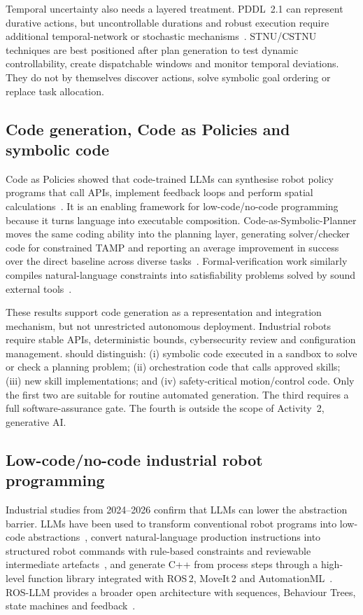 \documentclass{plan4ari_report}
\begin{document}
Temporal uncertainty also needs a layered treatment. PDDL~2.1 can represent durative actions, but uncontrollable durations and robust execution require additional temporal-network or stochastic mechanisms~\cite{fox2003pddl21,cimatti2018strong}. STNU/CSTNU techniques are best positioned after plan generation to test dynamic controllability, create dispatchable windows and monitor temporal deviations. They do not by themselves discover actions, solve symbolic goal ordering or replace task allocation.

\subsection{Code generation, Code as Policies and symbolic code}
Code as Policies showed that code-trained LLMs can synthesise robot policy programs that call APIs, implement feedback loops and perform spatial calculations~\cite{liang2023cap}. It is an enabling framework for low-code/no-code programming because it turns language into executable composition. Code-as-Symbolic-Planner moves the same coding ability into the planning layer, generating solver/checker code for constrained TAMP and reporting an average improvement in success over the direct baseline across diverse tasks~\cite{chen2025codesymbolic}. Formal-verification work similarly compiles natural-language constraints into satisfiability problems solved by sound external tools~\cite{hao2024formalverif}.

These results support code generation as a representation and integration mechanism, but not unrestricted autonomous deployment. Industrial robots require stable APIs, deterministic bounds, cybersecurity review and configuration management. \PlanARI{} should distinguish: (i) symbolic code executed in a sandbox to solve or check a planning problem; (ii) orchestration code that calls approved skills; (iii) new skill implementations; and (iv) safety-critical motion/control code. Only the first two are suitable for routine automated generation. The third requires a full software-assurance gate. The fourth is outside the scope of Activity~2, generative AI.

\subsection{Low-code/no-code industrial robot programming}
Industrial studies from 2024--2026 confirm that LLMs can lower the abstraction barrier. LLMs have been used to transform conventional robot programs into low-code abstractions~\cite{schenkenfelder2024lowcode}, convert natural-language production instructions into structured robot commands with rule-based constraints and reviewable intermediate artefacts~\cite{henzel2025nlinput}, and generate C++ from process steps through a high-level function library integrated with ROS\,2, MoveIt\,2 and AutomationML~\cite{syniawa2026semiauto}. ROS-LLM provides a broader open architecture with sequences, Behaviour Trees, state machines and feedback~\cite{mower2024rosllm}.
\end{document}
